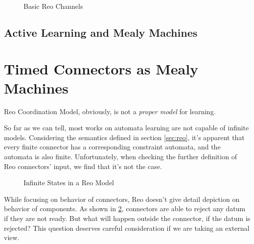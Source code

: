 \documentclass[conference, a4paper]{IEEEtran}
\begin{document}
\begin{figure}[h]
  \begin{center}
    
  \end{center}
  \caption{Basic Reo Channels}
  \label{fig:basic}
\end{figure}

\subsection{Active Learning and Mealy Machines}

\section{Timed Connectors as Mealy Machines}

Reo Coordination Model, obviously, is not a \emph{proper model} for learning. 

So far as we can tell, most works\cite{DBLP:conf/fase/RaffeltS06} on automata learning are not
capable of infinite models.  Considering the semantics defined in section
\ref{sec:reo}, it's apparent that every finite connector has a corresponding constraint
automata, and the automata is also finite. Unfortunately, when checking the further definition of
Reo connectors' input, we find that it's not the case.


\begin{figure}[h]
  \caption{Infinite States in a Reo Model}
  \label{fig:reoinfinite}
\end{figure}

While focusing on behavior of connectors, Reo doesn't give detail depiction on behavior of
components. As shown in \figurename \ref{fig:reoinfinite}, connectors are able to reject any datum
if they are not ready. But what will happen outside the connector, if the datum is rejected? This
question deserves careful consideration if we are taking an external view.
\end{document}
